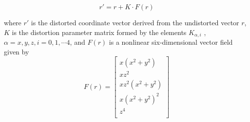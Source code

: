 \begin{equation}
  r' = r + K \cdot F(r)
\end{equation}

where $r'$ is the distorted coordinate vector derived from the undistorted vector $r$, $K$ is the distortion parameter matrix formed by the elements $K_{α,i}$ , $\alpha = x, y, z, i = 0,1,\cdots 4$, and $F(r)$ is a nonlinear six-dimensional vector field given by
\begin{equation}
  F(r) = 
  \begin{bmatrix}
    x(x^2 + y^2) \\
    xz^2 \\
    xz^2(x^2 + y^2) \\
    x(x^2 + y^2)^2 \\
    z^4 \\
  \end{bmatrix} 
\end{equation}




    
